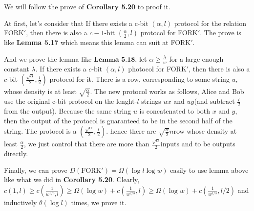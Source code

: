 \documentclass[11pt, fleqn, a4paper]{report}
\begin{document}
We will follow the prove of \textbf{Corollary 5.20} to proof it.

At first, let's consider that If there exists a c-bit $(\alpha, l)$ protocol for the relation FORK$'$, then there is also a $c-1$-bit $(\frac{\alpha}{2}, l)$ protocol for FORK$'$. The prove is like \textbf{Lemma 5.17} which means this lemma can suit at FORK$'$.

And we prove the lemma like $\textbf{Lemma 5.18}$, let $\alpha \geq \frac{\lambda}{w}$ for a large enough constant $\lambda$. If there exists a $c$-bit $(\alpha, l)$ photocol for FORK$'$, then there is also a $c$-bit $(\frac{\sqrt{\alpha}}{2}, \frac{l}{2})$ protocol for it. There is a row, corresponding to some string $u$, whose density is at least $\sqrt{\frac{\alpha}{2}}$. The new protocol works as follows, Alice and Bob use the original c-bit protocol on the lenght-$l$ strings $ux$ and $uy$(and subtract $\frac{l}{2}$ from the output). Because the same string $u$ is concatenated to both $x$ and $y$, then the output of the protocol is guaranteed to be in the second half of the string. The protocol is a $(\frac{\sqrt{\alpha}}{2}, \frac{l}{2})$. hence there are $\sqrt{\frac{\alpha}{2}}n$row whose density at least $\frac{\alpha}{2}$, we just control that there are more than $\frac{\sqrt{\alpha}}{2}$inputs and to be outputs directly.

Finally, we can prove $D(\mathrm{FORK}') = \Omega(\log{l}\log{w})$ easily to use lemma above like what we did in \textbf{Corollary 5.20}. Clearly, $c(1,l) \geq c(\frac{1}{w^{1/3}, l}) \geq \Omega(\log{w})+c(\frac{1}{w^{2/3}}, l)  \geq \Omega(\log{w})+c(\frac{1}{w^{1/3}}, l/2)$ and inductively $\theta(\log{l})$ times, we prove it.
\end{document}
